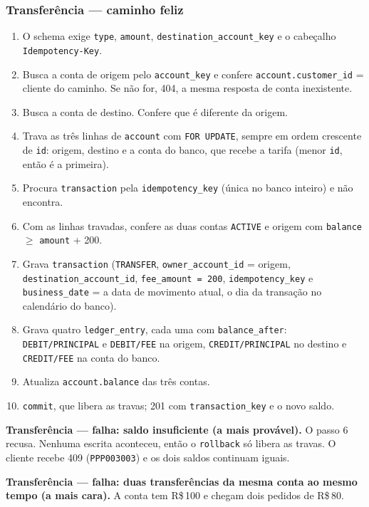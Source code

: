 \documentclass[11pt,a4paper]{article}
\newcommand{\tb}[1]{\texttt{#1}}
\newcommand{\rs}{R\$\,}
\begin{document}
\subsubsection*{Transferência --- caminho feliz}
\begin{enumerate}
  \item O schema exige \tb{type}, \tb{amount}, \tb{destination_account_key} e o cabeçalho
        \tb{Idempotency-Key}.
  \item Busca a conta de origem pelo \tb{account_key} e confere \tb{account.customer_id} = cliente
        do caminho. Se não for, 404, a mesma resposta de conta inexistente.
  \item Busca a conta de destino. Confere que é diferente da origem.
  \item Trava as três linhas de \tb{account} com \tb{FOR UPDATE}, sempre em ordem crescente de
        \tb{id}: origem, destino e a conta do banco, que recebe a tarifa (menor \tb{id}, então é a
        primeira).
  \item Procura \tb{transaction} pela \tb{idempotency_key} (única no banco inteiro) e não
        encontra.
  \item Com as linhas travadas, confere as duas contas \tb{ACTIVE} e origem com
        \tb{balance} $\geq$ \tb{amount} + 200.
  \item Grava \tb{transaction} (\tb{TRANSFER}, \tb{owner_account_id} = origem,
        \tb{destination_account_id}, \tb{fee_amount = 200}, \tb{idempotency_key} e
        \tb{business_date} = a data de movimento atual, o dia da transação no calendário do banco).
  \item Grava quatro \tb{ledger_entry}, cada uma com \tb{balance_after}:
        \tb{DEBIT/PRINCIPAL} e \tb{DEBIT/FEE} na origem, \tb{CREDIT/PRINCIPAL} no destino e
        \tb{CREDIT/FEE} na conta do banco.
  \item Atualiza \tb{account.balance} das três contas.
  \item \tb{commit}, que libera as travas; 201 com \tb{transaction_key} e o novo saldo.
\end{enumerate}

\textbf{Transferência --- falha: saldo insuficiente (a mais provável).} O passo 6 recusa. Nenhuma
escrita aconteceu, então o \tb{rollback} só libera as travas. O cliente recebe 409
(\tb{PPP003003}) e os dois saldos continuam iguais.

\textbf{Transferência --- falha: duas transferências da mesma conta ao mesmo tempo (a mais cara).}
A conta tem \rs 100 e chegam dois pedidos de \rs 80.
\end{document}
